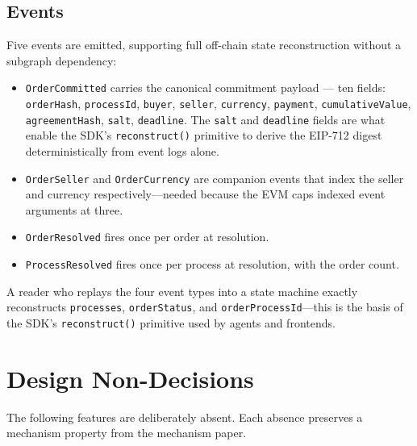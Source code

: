 \documentclass[11pt,a4paper]{article}
\theoremstyle{definition}
\theoremstyle{remark}
\begin{document}
\subsection{Events}

Five events are emitted, supporting full off-chain state
reconstruction without a subgraph dependency:

\begin{itemize}
  \item \texttt{OrderCommitted} carries the canonical commitment
    payload --- ten fields:
    \texttt{orderHash}, \texttt{processId}, \texttt{buyer},
    \texttt{seller}, \texttt{currency}, \texttt{payment},
    \texttt{cumulativeValue}, \texttt{agreementHash},
    \texttt{salt}, \texttt{deadline}. The \texttt{salt} and
    \texttt{deadline} fields are what enable the SDK's
    \texttt{reconstruct()} primitive to derive the EIP-712 digest
    deterministically from event logs alone.
  \item \texttt{OrderSeller} and \texttt{OrderCurrency} are
    companion events that index the seller and currency
    respectively---needed because the EVM caps indexed event
    arguments at three.
  \item \texttt{OrderResolved} fires once per order at resolution.
  \item \texttt{ProcessResolved} fires once per process at
    resolution, with the order count.
\end{itemize}

A reader who replays the four event types into a state machine
exactly reconstructs \texttt{processes}, \texttt{orderStatus}, and
\texttt{orderProcessId}---this is the basis of the SDK's
\texttt{reconstruct()} primitive used by agents and frontends.

\section{Design Non-Decisions}
\label{sec:non-decisions}

The following features are deliberately absent. Each absence
preserves a mechanism property
from the mechanism paper.
\end{document}
